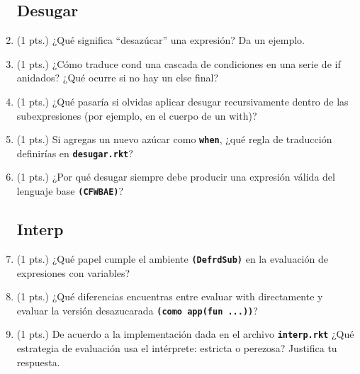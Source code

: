 \documentclass[11pt]{article}
\begin{document}
\begin{enumerate}
    \subsection{Desugar}
    \item (1 pts.) ¿Qué significa “desazúcar” una expresión? Da un ejemplo.
    \item (1 pts.) ¿Cómo traduce cond una cascada de condiciones en una serie de if anidados? ¿Qué ocurre si no hay un else final?
    \item (1 pts.) ¿Qué pasaría si olvidas aplicar desugar recursivamente dentro de las subexpresiones (por ejemplo, en el cuerpo de un with)?
    \item (1 pts.) Si agregas un nuevo azúcar como \texttt{\textbf{when}}, ¿qué regla de traducción definirías en \texttt{\textbf{desugar.rkt}}?
    \item (1 pts.) ¿Por qué desugar siempre debe producir una expresión válida del lenguaje base \texttt{\textbf{(CFWBAE)}}?
    \subsection{Interp}
    \item (1 pts.) ¿Qué papel cumple el ambiente \texttt{\textbf{(DefrdSub)}} en la evaluación de expresiones con variables?
    \item (1 pts.) ¿Qué diferencias encuentras entre evaluar with directamente y evaluar la versión desazucarada \texttt{\textbf{(como app(fun ...))}}?
    \item (1 pts.) De acuerdo a la implementación dada en el archivo \texttt{\textbf{interp.rkt}} ¿Qué estrategia de evaluación usa el intérprete: estricta o perezosa? Justifica tu respuesta.
\end{enumerate}
\end{document}
